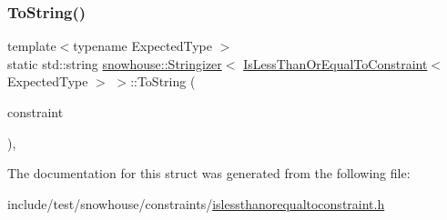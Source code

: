 \subsubsection{\texorpdfstring{ToString()}{ToString()}}
{\footnotesize\ttfamily template$<$typename Expected\+Type $>$ \\
static std\+::string \mbox{\hyperlink{structsnowhouse_1_1Stringizer}{snowhouse\+::\+Stringizer}}$<$ \mbox{\hyperlink{structsnowhouse_1_1IsLessThanOrEqualToConstraint}{Is\+Less\+Than\+Or\+Equal\+To\+Constraint}}$<$ Expected\+Type $>$ $>$\+::To\+String (\begin{DoxyParamCaption}\item[{const \mbox{\hyperlink{structsnowhouse_1_1IsLessThanOrEqualToConstraint}{Is\+Less\+Than\+Or\+Equal\+To\+Constraint}}$<$ Expected\+Type $>$ \&}]{constraint }\end{DoxyParamCaption})\hspace{0.3cm}{\ttfamily [inline]}, {\ttfamily [static]}}



The documentation for this struct was generated from the following file\+:\begin{DoxyCompactItemize}
\item 
include/test/snowhouse/constraints/\mbox{\hyperlink{islessthanorequaltoconstraint_8h}{islessthanorequaltoconstraint.\+h}}\end{DoxyCompactItemize}
